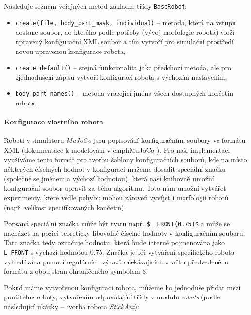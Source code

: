 Následuje seznam veřejných metod základní třídy
\texttt{BaseRobot}:

\begin{itemize}
    \item \texttt{create(file, body\_part\_mask, individual)} -- metoda, která
        na vstupu dostane soubor, do kterého podle potřeby (vývoj morfologie
        robota) vloží upravený konfigurační XML soubor a tím vytvoří pro
        simulační prostředí novou upravenou konfigurace robota,
    \item \texttt{create\_default()} -- stejná funkcionalita jako předchozí
        metoda, ale pro zjednodušení zápisu vytvoří konfiguraci robota s
        výchozím nastavením,
    \item \texttt{body\_part\_names()} -- metoda vracející jména všech
        dostupných končetin robota.
\end{itemize}

\paragraph{Konfigurace vlastního robota}
Roboti v simulátoru \emph{MuJoCo} jsou popisování konfiguračními soubory ve
formátu XML (dokumentace k modelování v emph{MuJoCo}
\citep{modeling-mujocodocumentation}). Pro naši implementaci využíváme tento
formát pro tvorbu šablony konfiguračních souborů, kde na místo některých
číselných hodnot v konfiguraci můžeme dosadit speciální značku (společně se
jménem a výchozí hodnotou), která naší knihovně umožní konfigurační soubor
upravit za běhu algoritmu. Toto nám umožní vytvářet experimenty, které vedle
pohybu mohou zároveň vyvíjet i morfologii robotů (např. velikost
specifikovaných končetin). 

Popsaná speciální značka může být tvaru např. \texttt{\$L\_FRONT(0.75)\$} a
může se nacházet na pozici teoreticky libovolné číselné hodnoty v konfiguračním
souboru. Tato značka tedy označuje hodnotu, která bude interně pojmenována jako
\texttt{L\_FRONT} s výchozí hodnotou $0.75$. Značka je při vytváření
specifického robota vyhledávána pomocí regulárních výrazů očekávajících značku
předvedeného formátu z obou stran ohraničeného symbolem \$.

Pokud máme vytvořenou konfiguraci robota, můžeme ho jednoduše přidat mezi
použitelné roboty, vytvořením odpovídající třídy v modulu \emph{robots} (podle
následující ukázky -- tvorba robota \emph{StickAnt}):

